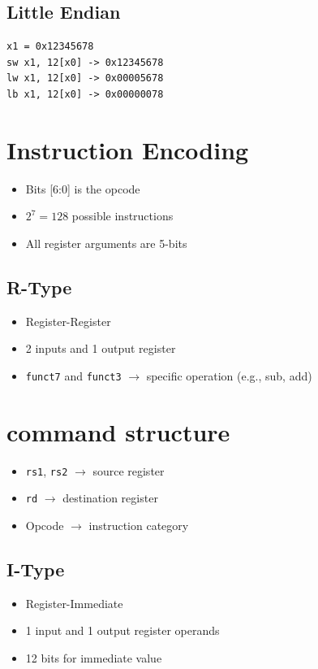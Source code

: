\documentclass{article}
\begin{document}
\subsection*{Little Endian}
\begin{verbatim}
x1 = 0x12345678
sw x1, 12[x0] -> 0x12345678
lw x1, 12[x0] -> 0x00005678
lb x1, 12[x0] -> 0x00000078
\end{verbatim}

\section*{Instruction Encoding}
\begin{itemize}
    \item Bits [6:0] is the opcode
    \item $2^7 = 128$ possible instructions
    \item All register arguments are 5-bits
\end{itemize}

\subsection*{R-Type}
\begin{itemize}
    \item Register-Register
    \item 2 inputs and 1 output register
    \item \texttt{funct7} and \texttt{funct3} $\rightarrow$ specific operation (e.g., sub, add)
\end{itemize}

\section*{command structure}
\begin{itemize}
    \item \texttt{rs1}, \texttt{rs2} $\rightarrow$ source register
    \item \texttt{rd} $\rightarrow$ destination register
    \item Opcode $\rightarrow$ instruction category
\end{itemize}

\subsection*{I-Type}
\begin{itemize}
    \item Register-Immediate
    \item 1 input and 1 output register operands
    \item 12 bits for immediate value
\end{itemize}
\end{document}
